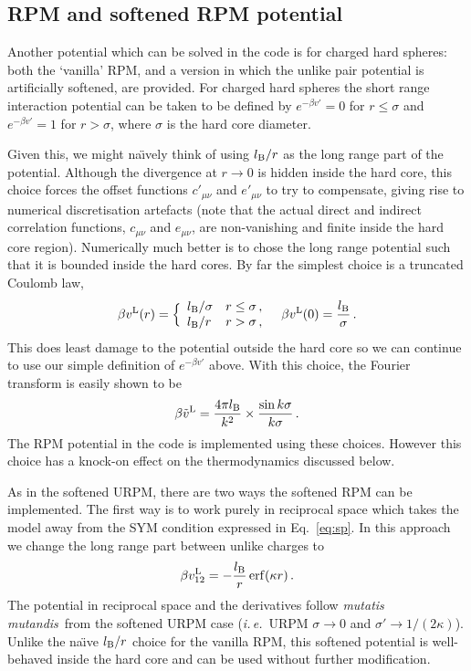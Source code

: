 \documentclass[12pt,a4paper]{article}
\DeclareMathOperator{\erf}{erf}
\newcommand{\latin}[1]{\emph{#1}}
\newcommand{\ie}{\latin{i.\,e.}}
\newcommand{\mutmut}{\latin{mutatis mutandis}}
\newcommand{\lr}{^{\mathrm{L}}}
\newcommand{\Eqref}[1]{Eq.~\eqref{#1}}
\begin{document}
\subsection{RPM and softened RPM potential}
\label{sec:softRPM}
%
Another potential which can be solved in the code is for charged hard
spheres: both the `vanilla' RPM, and a version in which the unlike
pair potential is artificially softened, are provided.  For charged
hard spheres the short range interaction potential can be taken to be
defined by $e^{-\beta v'}=0$ for $r\le\sigma$ and $e^{-\beta v'}=1$
for $r>\sigma$, where $\sigma$ is the hard core diameter.

Given this, we might na\"\i{}vely think of using $l_{\mathrm{B}}/r$ as the long
range part of the potential.  Although the divergence at $r\to0$ is
hidden inside the hard core, this choice forces the offset functions
$c'_{\mu\nu}$ and $e'_{\mu\nu}$ to try to compensate, giving rise to
numerical discretisation artefacts (note that the actual direct and
indirect correlation functions, $c_{\mu\nu}$ and $e_{\mu\nu}$, are
non-vanishing and finite inside the hard core region).  Numerically
much better is to chose the long range potential such that it is
bounded inside the hard cores.  By far the simplest choice is a
truncated Coulomb law,
%
\begin{equation}
  \beta v\lr(r)=\Bigl\{\begin{array}{ll}
  \lB/\sigma & r\le\sigma\,,\\
  \lB/r & r > \sigma\,,
  \end{array}\quad \beta v\lr(0)=\frac{\lB}{\sigma}\,.
\end{equation}
%
This does least damage to the potential outside the hard core so we
can continue to use our simple definition of $e^{-\beta v'}$ above.
With this choice, the Fourier transform is easily shown to be
%
\begin{equation}
  \beta {\tilde v}\lr=\frac{4\pi\lB}{k^2}\times\frac{\sin k\sigma}{k\sigma}\,.
\end{equation}
%
The RPM potential in the code is implemented using these
choices. However this choice has a knock-on effect on the
thermodynamics discussed below.

As in the softened URPM, there are two ways the softened RPM can be
implemented.  The first way is to work purely in reciprocal space
which takes the model away from the SYM condition expressed in
\Eqref{eq:sp}.  In this approach we change the long range part between
unlike charges to
%
\begin{equation}
\beta v_{12}\lr=-\frac{\lB}{r} \erf(\kappa r)\,.
\end{equation}
%
The potential in reciprocal space and the derivatives follow
\mutmut\ from the softened URPM case (\ie\ URPM $\sigma\to0$ and
$\sigma'\to1/(2\kappa)$).  Unlike the na\"\i{}ve $l_{\mathrm{B}}/r$ choice for
the vanilla RPM, this softened potential is well-behaved inside the
hard core and can be used without further modification.
  
\end{document}

